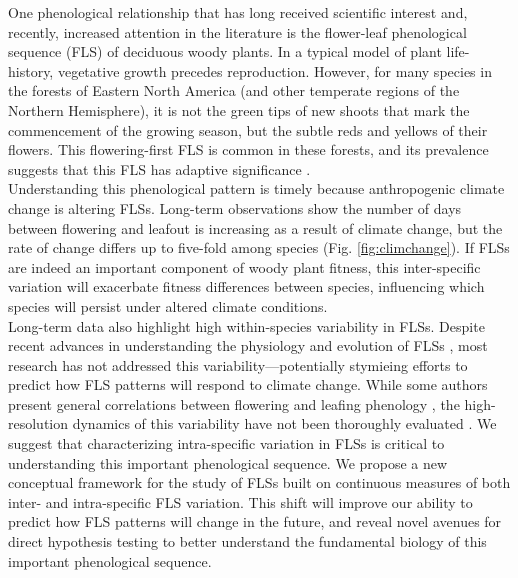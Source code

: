 \documentclass{article}
\begin{document}
\noindent One phenological relationship that has long received scientific interest \citep[see][]{Robertson1895} and, recently, increased attention in the literature \citep{Savage2019, Gougherty2018} is the flower-leaf phenological sequence (FLS) of deciduous woody plants. In a typical model of plant life-history, vegetative growth precedes reproduction. However, for many species in the forests of Eastern North America (and other temperate regions of the Northern Hemisphere), it is not the green tips of new shoots that mark the commencement of the growing season, but the subtle reds and yellows of their flowers. This flowering-first FLS is common in these forests, and its prevalence suggests that this FLS has adaptive significance \citep{Rathcke_1985}.\\ 

\noindent Understanding this phenological pattern is timely because anthropogenic climate change is altering FLSs. Long-term observations show the number of days between flowering and leafout is increasing as a result of climate change, but the rate of change differs up to five-fold among species (Fig. \ref{fig:climchange}).  If FLSs are indeed an important component of woody plant fitness, this inter-specific variation will exacerbate fitness differences between species, influencing which species will persist under altered climate conditions.\\ %

\noindent Long-term data also highlight high within-species variability in FLSs. Despite recent advances in understanding the physiology and evolution of FLSs \citep{Gougherty2018,Savage2019}, most research has not addressed this variability---potentially stymieing efforts to predict how FLS patterns will respond to climate change. While some authors present general correlations between flowering and leafing phenology \citep{Lechowicz_1995, Ettinger2018}, the high-resolution dynamics of this variability have not been thoroughly evaluated \citep{Gougherty2018}. We suggest that characterizing intra-specific variation in FLSs is critical to understanding this important phenological sequence. We propose a new conceptual framework for the study of FLSs built on continuous measures of both inter- and intra-specific FLS variation. This shift will improve our ability to predict how FLS patterns will change in the future, and reveal novel avenues for direct hypothesis testing to better understand the fundamental biology of this important phenological sequence.\\
\end{document}
